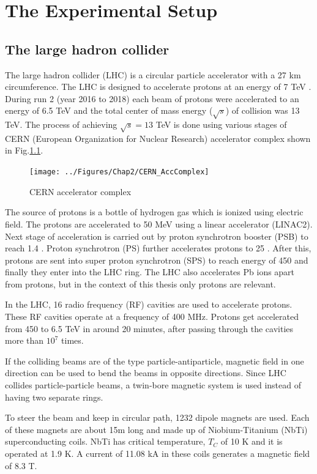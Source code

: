 \chapter{The Experimental Setup}
\label{Chap2}

\section{The large hadron collider}
The large hadron collider (LHC) is a circular particle accelerator with a 27 km circumference. The LHC is designed to accelerate protons at an energy of 7 TeV \cite{Bruning:782076}. During run 2 (year 2016 to 2018) each beam of protons were accelerated to an energy of 6.5 TeV and the total center of mass energy ($\sqrt{s}$) of collision was 13 TeV. The process of achieving $\sqrt{s} = 13$ TeV is done using various stages of CERN (European Organization for Nuclear Research) accelerator complex \cite{Haffner:1621894} shown in Fig.\ref{fig:CERN_AccComplex}.
\begin{figure}[h!]
\centering
\texttt{[image: ../Figures/Chap2/CERN\_AccComplex]}
\caption[CERN accelerator complex]{CERN accelerator complex}
\label{fig:CERN_AccComplex}
\end{figure}

The source of protons is a bottle of hydrogen gas which is ionized using electric field. The protons are accelerated to 50 MeV using a linear accelerator (LINAC2). Next stage of acceleration is carried out by proton synchrotron booster (PSB) to reach 1.4 \gev. Proton synchrotron (PS) further accelerates protons to 25 \gev. After this, protons are sent into super proton synchrotron (SPS) to reach energy of 450 \gev and finally they enter into the LHC ring. The LHC also accelerates Pb ions apart from protons, but in the context of this thesis only protons are relevant.

In the LHC, 16 radio frequency (RF) cavities are used to accelerate protons. These RF cavities operate at a frequency of 400 MHz. Protons get accelerated from 450 \gev to 6.5 TeV in around 20 minutes, after passing through the cavities more than $10^7$ times.

If the colliding beams are of the type particle-antiparticle, magnetic field in one direction can be used to bend the beams in opposite directions. Since LHC collides particle-particle beams, a twin-bore magnetic system is used instead of having two separate rings.

To steer the beam and keep in circular path, 1232 dipole magnets are used. Each of these magnets are about 15m long and made up of Niobium-Titanium (NbTi) superconducting coils. NbTi has critical temperature, $T_C$ of 10 K and it is operated at 1.9 K. A current of 11.08 kA in these coils generates a magnetic field of 8.3 T.

